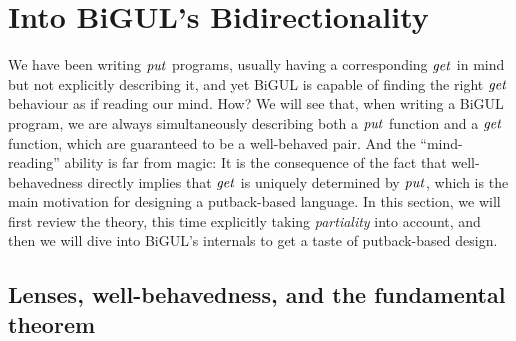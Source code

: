 













\section{Into BiGUL's Bidirectionality}

We have been writing \ensuremath{\Varid{put}} programs, usually having a corresponding \ensuremath{\Varid{get}} in mind but not explicitly describing it, and yet BiGUL is capable of finding the right \ensuremath{\Varid{get}} behaviour as if reading our mind. How?
We will see that, when writing a BiGUL program, we are always simultaneously describing both a \ensuremath{\Varid{put}} function and a \ensuremath{\Varid{get}} function, which are guaranteed to be a well-behaved pair.
And the ``mind-reading'' ability is far from magic:
It is the consequence of the fact that well-behavedness directly implies that \ensuremath{\Varid{get}} is uniquely determined by \ensuremath{\Varid{put}}, which is the main motivation for designing a putback-based language.
In this section, we will first review the theory, this time explicitly taking \emph{partiality} into account, and then we will dive into BiGUL's internals to get a taste of putback-based design.

\subsection{Lenses, well-behavedness, and the fundamental theorem}

